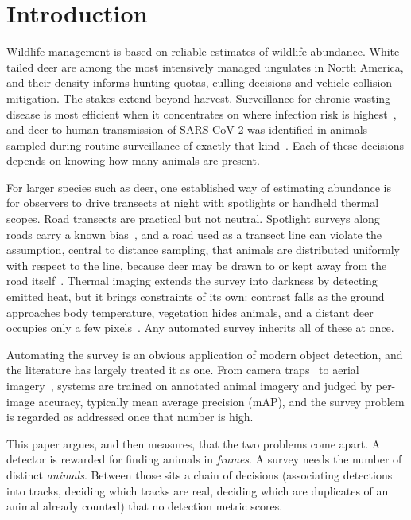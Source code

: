 \section{Introduction}
\label{sec:intro}

Wildlife management is based on reliable estimates of wildlife abundance. White-tailed deer
are among the most intensively managed ungulates in North America, and their density informs
hunting quotas, culling decisions and vehicle-collision mitigation. The stakes extend beyond
harvest. Surveillance for chronic wasting disease is most efficient when it concentrates on
where infection risk is highest~\cite{jennelle2018applying}, and deer-to-human transmission of
SARS-CoV-2 was identified in animals sampled during routine surveillance of exactly that
kind~\cite{pickering2022divergent}. Each of these decisions depends on knowing how many
animals are present.

For larger species such as deer, one established way of estimating abundance is for
observers to drive transects at night with spotlights or handheld thermal scopes. Road
transects are practical but not neutral. Spotlight surveys along roads carry a known
bias~\cite{vercauteren2011managing}, and a road used as a transect line can violate the
assumption, central to distance sampling, that animals are distributed uniformly with respect
to the line, because deer may be drawn to or kept away from the road
itself~\cite{diefenbach2025accounting}. Thermal imaging extends the survey into darkness by
detecting emitted heat, but it brings constraints of its own: contrast falls as the ground
approaches body temperature, vegetation hides animals, and a distant deer occupies only a few
pixels~\cite{burke2019optimizing}. Any automated survey inherits all of these at once.

Automating the survey is an obvious application of modern object detection, and the
literature has largely treated it as one. From camera traps~\cite{norouzzadeh2018automatically}
to aerial imagery~\cite{kellenberger2018detecting}, systems are trained on annotated animal
imagery and judged by per-image accuracy, typically mean average precision (mAP), and the
survey problem is regarded as addressed once that number is high.

This paper argues, and then measures, that the two problems come apart. A detector is
rewarded for finding animals in \emph{frames}. A survey needs the number of distinct
\emph{animals}. Between those sits a chain of decisions (associating detections into tracks,
deciding which tracks are real, deciding which are duplicates of an animal already counted)
that no detection metric scores.

